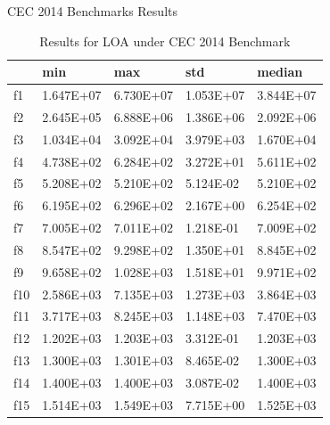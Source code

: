 \documentclass{beamer}
\begin{document}
\begin{frame}{CEC 2014 Benchmarks Results}
\begin{table}[]
\begin{tabular}{lllll}
    & \textbf{min}       & \textbf{max}       & \textbf{std}       & \textbf{median}    \\ \hline
f1  & 1.647E+07 & 6.730E+07 & 1.053E+07 & 3.844E+07 \\
f2  & 2.645E+05 & 6.888E+06 & 1.386E+06 & 2.092E+06 \\
f3  & 1.034E+04 & 3.092E+04 & 3.979E+03 & 1.670E+04 \\
f4  & 4.738E+02 & 6.284E+02 & 3.272E+01 & 5.611E+02 \\
f5  & 5.208E+02 & 5.210E+02 & 5.124E-02 & 5.210E+02 \\
f6  & 6.195E+02 & 6.296E+02 & 2.167E+00 & 6.254E+02 \\
f7  & 7.005E+02 & 7.011E+02 & 1.218E-01 & 7.009E+02 \\
f8  & 8.547E+02 & 9.298E+02 & 1.350E+01 & 8.845E+02 \\
f9  & 9.658E+02 & 1.028E+03 & 1.518E+01 & 9.971E+02 \\
f10 & 2.586E+03 & 7.135E+03 & 1.273E+03 & 3.864E+03 \\
f11 & 3.717E+03 & 8.245E+03 & 1.148E+03 & 7.470E+03 \\
f12 & 1.202E+03 & 1.203E+03 & 3.312E-01 & 1.203E+03 \\
f13 & 1.300E+03 & 1.301E+03 & 8.465E-02 & 1.300E+03 \\
f14 & 1.400E+03 & 1.400E+03 & 3.087E-02 & 1.400E+03 \\
f15 & 1.514E+03 & 1.549E+03 & 7.715E+00 & 1.525E+03 \\
\end{tabular}
\caption{Results for LOA under CEC 2014 Benchmark}
\end{table}
\end{frame}
\end{document}
